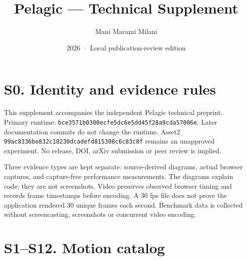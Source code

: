 \documentclass[
  english,
  11pt,
]{article}
\title{Pelagic --- Technical Supplement}
\author{Mani Marami Milani}
\date{2026 · Local publication-review edition}
\begin{document}
\maketitle

\section{S0. Identity and evidence
rules}\label{s0.-identity-and-evidence-rules}

This supplement accompanies the independent Pelagic technical preprint.
Primary runtime: \texttt{bce3571b0300ecfe5dc6e5dd45f28a9cda57006e}.
Later documentation commits do not change the runtime. Asset2
\texttt{99ac8336be832c18230dcadefd815308c6c83c8f} remains an unapproved
experiment. No release, DOI, arXiv submission or peer review is implied.

Three evidence types are kept separate: source-derived diagrams, actual
browser captures, and capture-free performance measurements. The
diagrams explain code; they are not screenshots. Video preserves
observed browser timing and records frame timestamps before encoding. A
30 fps file does not prove the application rendered 30 unique frames
each second. Benchmark data is collected without screencasting,
screenshots or concurrent video encoding.

\section{S1--S12. Motion catalog}\label{s1s12.-motion-catalog}
\end{document}
